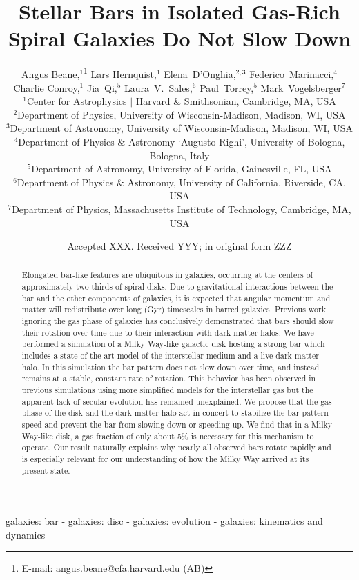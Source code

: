 \documentclass[fleqn,usenatbib]{mnras}
\title[Stellar Bars and Gas]{Stellar Bars in Isolated Gas-Rich Spiral Galaxies Do Not Slow Down}
\author[A. Beane et al.]{Angus Beane,$^{1}$\thanks{E-mail: angus.beane@cfa.harvard.edu (AB)}
Lars Hernquist,$^{1}$
Elena~D'Onghia,$^{2,3}$
Federico~Marinacci,$^{4}$
Charlie Conroy,$^{1}$
Jia~Qi,$^{5}$\newauthor
Laura~V.~Sales,$^{6}$
Paul~Torrey,$^{5}$
Mark~Vogelsberger$^{7}$
\\
$^{1}$Center for Astrophysics $|$ Harvard \& Smithsonian,  Cambridge, MA, USA\\
$^{2}$Department of Physics, University of Wisconsin-Madison, Madison, WI, USA\\
$^{3}$Department of Astronomy, University of Wisconsin-Madison, Madison, WI, USA\\
$^{4}$Department of Physics \& Astronomy `Augusto Righi', University of Bologna, Bologna, Italy\\
$^{5}$Department of Astronomy, University of Florida, Gainesville, FL, USA\\
$^{6}$Department of Physics \& Astronomy, University of California, Riverside, CA, USA\\
$^{7}$Department of Physics, Massachusetts Institute of Technology, Cambridge, MA, USA\\
}
\date{Accepted XXX. Received YYY; in original form ZZZ}
\begin{document}
\label{firstpage}
\pagerange{\pageref{firstpage}--\pageref{lastpage}}
\maketitle

\begin{abstract}
Elongated bar-like features are ubiquitous in galaxies, occurring at the centers
of approximately two-thirds of spiral disks.  Due to gravitational interactions
between the bar and the other components of galaxies, it is expected that
angular momentum and matter will redistribute over long (Gyr) timescales in
barred galaxies. Previous work ignoring the gas phase of galaxies has
conclusively demonstrated that bars should slow their rotation over time due to
their interaction with dark matter halos. We have performed a simulation of a
Milky Way-like galactic disk hosting a strong bar which includes a
state-of-the-art model of the interstellar medium and a live dark matter halo.
In this simulation the bar pattern does not slow down over time, and instead
remains at a stable, constant rate of rotation. This behavior has been observed
in previous simulations using more simplified models for the interstellar gas
but the apparent lack of secular evolution has remained unexplained. We propose
that the gas phase of the disk and the dark matter halo act in concert to
stabilize the bar pattern speed and prevent the bar from slowing down or
speeding up. We find that in a Milky Way-like disk, a gas fraction of only about
5\% is necessary for this mechanism to operate. Our result naturally explains
why nearly all observed bars rotate rapidly and is especially relevant for our
understanding of how the Milky Way arrived at its present state.
\end{abstract}

\begin{keywords}
galaxies: bar - galaxies: disc - galaxies: evolution - galaxies: kinematics and
dynamics
\end{keywords}


\end{document}
